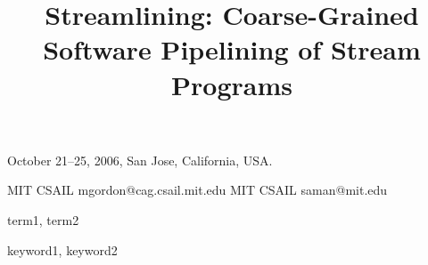 \documentclass[preprint]{sigplanconf}
\begin{document}
 {October 21--25, 2006, San Jose, California, USA.} 


\title{Streamlining: Coarse-Grained Software Pipelining of Stream Programs}

           {MIT CSAIL}
           {mgordon@cag.csail.mit.edu}
           {MIT CSAIL}
           {saman@mit.edu}

\maketitle

\begin{abstract}

\end{abstract}


\terms
term1, term2

\keywords
keyword1, keyword2







{\small
{

}
}

\end{document}
